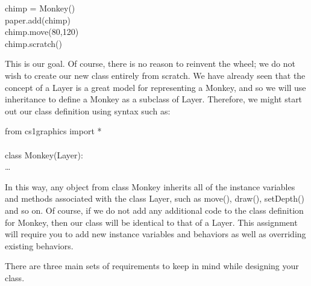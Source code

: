 \documentclass[11pt]{article}
\begin{document}
\smallskip

\begin{algorithm}
    chimp = Monkey()\\
    paper.add(chimp)\\
    chimp.move(80,120)\\
    chimp.scratch()
\end{algorithm}

\smallskip

This is our goal. Of course, there is no reason to reinvent the
wheel; we do not wish to create our new class entirely from scratch.
We have already seen that the concept of a Layer is a great model
for representing a Monkey, and so we will use inheritance to define
a Monkey as a subclass of Layer. Therefore, we might start out our
class definition using syntax such as:

\smallskip

\begin{algorithm}
from cs1graphics import *\\
 \\
class Monkey(Layer): \+ \\
\ldots \-
\end{algorithm}

\smallskip

In this way, any object from class Monkey inherits all of the
instance variables and methods associated with the class Layer, such
as move(), draw(), setDepth() and so on. Of course, if we do not add
any additional code to the class definition for Monkey, then our
class will be identical to that of a Layer. This assignment will
require you to add new instance variables and behaviors as well as
overriding existing behaviors.

\bigskip

\newpage


There are three main sets of requirements to keep in mind while
designing your class.
\end{document}
